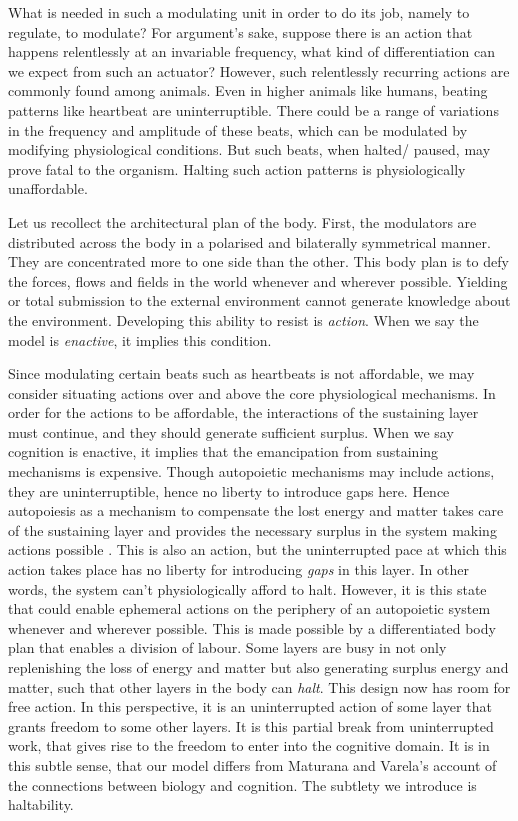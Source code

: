 What is needed in such a modulating unit in order to do its job, namely to regulate, to modulate? For argument's sake, suppose there is an action that happens relentlessly at an invariable frequency, what kind of differentiation can we expect from such an actuator? However, such relentlessly recurring actions are commonly found among animals. Even in higher animals like humans, beating patterns like heartbeat are uninterruptible. There could be a range of variations in the frequency and amplitude of these beats, which can be modulated by modifying physiological conditions. But such beats, when halted/ paused, may prove fatal to the organism. Halting such action patterns is physiologically unaffordable.

Let us recollect the architectural plan of the body. First, the modulators are distributed across the body in a polarised and bilaterally symmetrical manner. They are concentrated more to one side than the other. This body plan is to defy the forces, flows and fields in the world whenever and wherever possible. Yielding or total submission to the external environment cannot generate knowledge about the environment. Developing this ability to resist is \textit{action}. When we say the model is \textit{enactive}, it implies this condition.

 Since modulating certain beats such as heartbeats is not affordable, we may consider situating actions over and above the core physiological mechanisms. In order for the actions to be affordable, the interactions of the sustaining layer  must continue, and they should generate sufficient surplus. When we say cognition is enactive, it implies that the emancipation from sustaining mechanisms is expensive. Though autopoietic mechanisms may include actions, they are uninterruptible, hence no liberty to introduce gaps here. Hence autopoiesis as a mechanism to compensate the lost energy and matter takes care of the sustaining layer and provides the necessary surplus in the system making actions possible \cite{maturana1991autopoiesis}. This is also an action, but the uninterrupted pace at which this action takes place has no liberty for introducing \textit{gaps} in this layer. In other words, the system can't physiologically afford to halt. However, it is this state that could enable ephemeral actions on the periphery of an autopoietic system whenever and wherever possible. This is made possible by a differentiated body plan that enables a division of labour. Some layers are busy in not only replenishing the loss of energy and matter but also generating surplus energy and matter, such that other layers in the body can \textit{halt}. This design now has room for free action. In this perspective, it is an uninterrupted action of some layer that grants freedom to some other layers. It is this partial break from uninterrupted work, that gives rise to the freedom to enter into the cognitive domain. It is in this subtle sense, that our model differs from Maturana and Varela's account of the connections between biology and cognition. The subtlety we introduce is haltability. 

